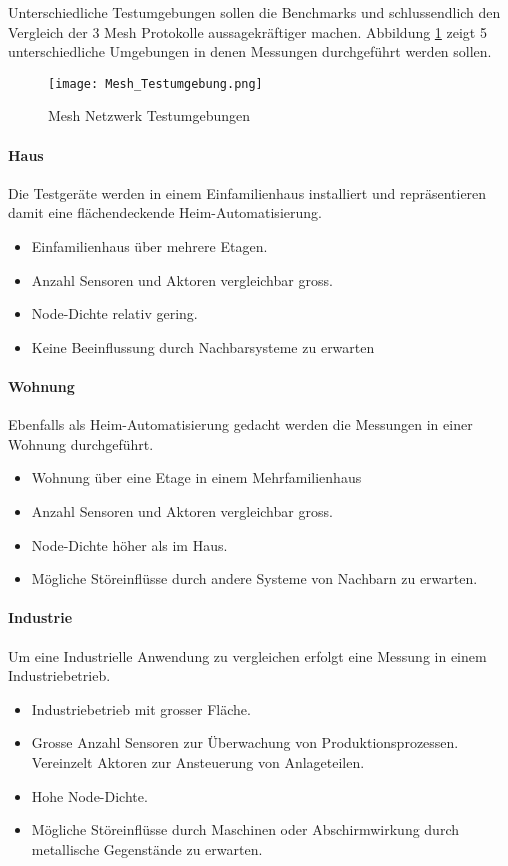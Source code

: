 Unterschiedliche Testumgebungen sollen die Benchmarks und schlussendlich den Vergleich der 3 Mesh Protokolle aussagekräftiger machen. Abbildung \ref{fig:MeshNetzwerkTestumgebungen} zeigt 5 unterschiedliche Umgebungen in denen Messungen durchgeführt werden sollen.

\begin{figure}[H]
	\centering
	\texttt{[image: Mesh\_Testumgebung.png]}
	\caption{Mesh Netzwerk Testumgebungen}\label{fig:MeshNetzwerkTestumgebungen}
\end{figure}

\paragraph{Haus}
Die Testgeräte werden in einem Einfamilienhaus installiert und repräsentieren damit eine flächendeckende Heim-Automatisierung.
	\begin{itemize}
		\item Einfamilienhaus über mehrere Etagen.
		\item Anzahl Sensoren und Aktoren vergleichbar gross.
		\item Node-Dichte relativ gering.
		\item Keine Beeinflussung durch Nachbarsysteme zu erwarten
	\end{itemize}
	
\paragraph{Wohnung}
Ebenfalls als Heim-Automatisierung gedacht werden die Messungen in einer Wohnung durchgeführt.
	\begin{itemize}
		\item Wohnung über eine Etage in einem Mehrfamilienhaus
		\item Anzahl Sensoren und Aktoren vergleichbar gross.
		\item Node-Dichte höher als im Haus.
		\item Mögliche Störeinflüsse durch andere Systeme von Nachbarn zu 					erwarten.
	\end{itemize}
	
\paragraph{Industrie}
Um eine Industrielle Anwendung zu vergleichen erfolgt eine Messung in einem Industriebetrieb.
	\begin{itemize}
		\item Industriebetrieb mit grosser Fläche.
		\item Grosse Anzahl Sensoren zur Überwachung von Produktionsprozessen. 				Vereinzelt Aktoren zur Ansteuerung von Anlageteilen.
		\item Hohe Node-Dichte.
		\item Mögliche Störeinflüsse durch Maschinen oder Abschirmwirkung durch 			metallische Gegenstände zu erwarten.
	\end{itemize}

